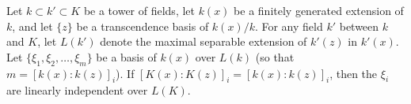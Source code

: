 Let $k \subset k' \subset K$ be a tower of fields, let $k(x)$ be a finitely generated extension of $k$, and let $\{z\}$ be a transcendence basis of $k(x)/k$. For any field $k'$ between $k$ and $K$, let $L(k')$ denote the maximal separable extension of $k'(z)$ in $k'(x)$. Let $\{\xi_1, \xi_2, \dots, \xi_m\}$ be a basis of $k(x)$ over $L(k)$ (so that $m = [k(x):k(z)]_i$). If $[K(x):K(z)]_i = [k(x):k(z)]_i$, then the $\xi_i$ are linearly independent over $L(K)$.
